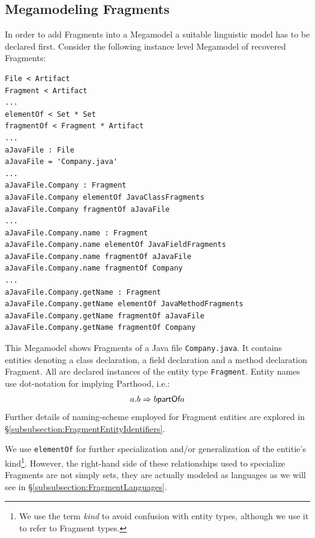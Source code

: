 \subsection{Megamodeling Fragments}
\label{subsection:MegamodelingFragments}
In order to add \glspl{Fragment} into a \gls{Megamodel} a suitable linguistic model has to be declared first. 
Consider the following instance level \gls{Megamodel} of recovered \glspl{Fragment}:
\begin{lstlisting}[numbers=none]
File < Artifact
Fragment < Artifact
...
elementOf < Set * Set
fragmentOf < Fragment * Artifact
...
aJavaFile : File
aJavaFile = 'Company.java'
...
aJavaFile.Company : Fragment
aJavaFile.Company elementOf JavaClassFragments
aJavaFile.Company fragmentOf aJavaFile
...
aJavaFile.Company.name : Fragment
aJavaFile.Company.name elementOf JavaFieldFragments
aJavaFile.Company.name fragmentOf aJavaFile
aJavaFile.Company.name fragmentOf Company
...
aJavaFile.Company.getName : Fragment
aJavaFile.Company.getName elementOf JavaMethodFragments
aJavaFile.Company.getName fragmentOf aJavaFile
aJavaFile.Company.getName fragmentOf Company
\end{lstlisting}
This \gls{Megamodel} shows \glspl{Fragment} of a \gls{Java} file \texttt{Company.java}.
It contains entities denoting a class declaration, a field declaration and a method declaration \gls{Fragment}.
All are declared instances of the entity type \texttt{Fragment}.
Entity names use dot-notation for implying \gls{Parthood}, i.e.:
\begin{align*}
a.b \Rightarrow b \textsf{partOf} a
\end{align*}
Further details of naming-scheme employed for \gls{Fragment} entities are explored in §\ref{subsubsection:FragmentEntityIdentifiers}.

We use \texttt{elementOf} for further specialization and/or generalization of the entitie's kind\footnote{We use the term \textit{kind} to avoid confusion with entity types, although we use it to refer to \gls{Fragment} types.}.
However, the right-hand side of these relationships used to specialize \glspl{Fragment} are not simply sets, they are actually modeled as languages as we will see in §\ref{subsubsection:FragmentLanguages}.

